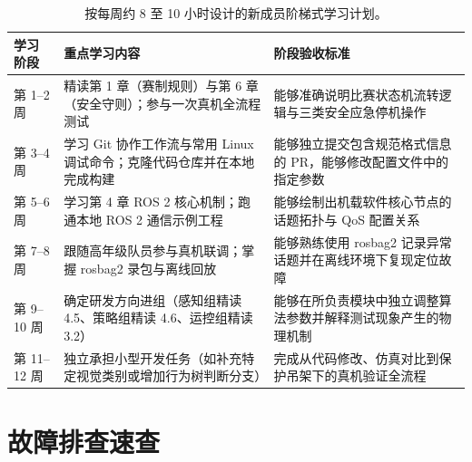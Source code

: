\begin{table}[H]
\centering
\small
\begin{tabularx}{\textwidth}{p{2.2cm} p{5.6cm} X}
\toprule
\textbf{学习阶段} & \textbf{重点学习内容} & \textbf{阶段验收标准} \\
\midrule
第 1--2 周 & 精读第 1 章（赛制规则）与第 6 章（安全守则）；参与一次真机全流程测试 & 能够准确说明比赛状态机流转逻辑与三类安全应急停机操作 \\
\addlinespace
第 3--4 周 & 学习 Git 协作工作流与常用 Linux 调试命令；克隆代码仓库并在本地完成构建 & 能够独立提交包含规范格式信息的 PR，能够修改配置文件中的指定参数 \\
\addlinespace
第 5--6 周 & 学习第 4 章 ROS 2 核心机制；跑通本地 ROS 2 通信示例工程 & 能够绘制出机载软件核心节点的话题拓扑与 QoS 配置关系 \\
\addlinespace
第 7--8 周 & 跟随高年级队员参与真机联调；掌握 rosbag2 录包与离线回放 & 能够熟练使用 rosbag2 记录异常话题并在离线环境下复现定位故障 \\
\addlinespace
第 9--10 周 & 确定研发方向进组（感知组精读 4.5、策略组精读 4.6、运控组精读 3.2） & 能够在所负责模块中独立调整算法参数并解释测试现象产生的物理机制 \\
\addlinespace
第 11--12 周 & 独立承担小型开发任务（如补充特定视觉类别或增加行为树判断分支） & 完成从代码修改、仿真对比到保护吊架下的真机验证全流程 \\
\bottomrule
\end{tabularx}
\caption{按每周约 8 至 10 小时设计的新成员阶梯式学习计划。}
\end{table}

\section{故障排查速查}

